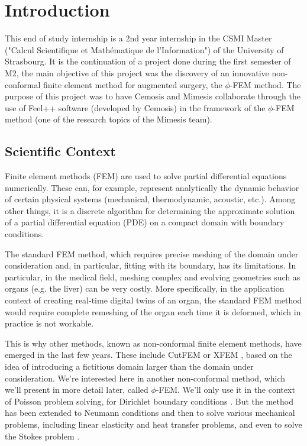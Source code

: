 \section{Introduction}

This end of study internship is a 2nd year internship in the CSMI Master ("Calcul Scientifique et Mathématique de l'Information") of the University of Strasbourg. It is the continuation of a project done during the first semester of M2, the main objective of this project was the discovery of an innovative non-conformal finite element method for augmented surgery, the $\phi$-FEM method. The purpose of this project was to have Cemosis and Mimesis collaborate through the use of Feel++ software (developed by Cemosis) in the framework of the $\phi$-FEM method (one of the research topics of the Mimesis team).

\subsection{Scientific Context}

Finite element methods (FEM) are used to solve partial differential equations numerically. These can, for example, represent analytically the dynamic behavior of certain physical systems (mechanical, thermodynamic, acoustic, etc.). Among other things, it is a discrete algorithm for determining the approximate solution of a partial differential equation (PDE) on a compact domain with boundary conditions. 

The standard FEM method, which requires precise meshing of the domain under consideration and, in particular, fitting with its boundary, has its limitations. In particular, in the medical field, meshing complex and evolving geometries such as organs (e.g. the liver) can be very costly. More specifically, in the application context of creating real-time digital twins of an organ, the standard FEM method would require complete remeshing of the organ each time it is deformed, which in practice is not workable. 

This is why other methods, known as non-conformal finite element methods, have emerged in the last few years. These include CutFEM  or XFEM , based on the idea of introducing a fictitious domain larger than the domain under consideration. We're interested here in another non-conformal method, which we'll present in more detail later, called $\phi$-FEM. We'll only use it in the context of Poisson problem solving, for Dirichlet boundary conditions . But the method has been extended to Neumann conditions  and then to solve various mechanical problems, including linear elasticity and heat transfer problems, and even to solve the Stokes problem .

